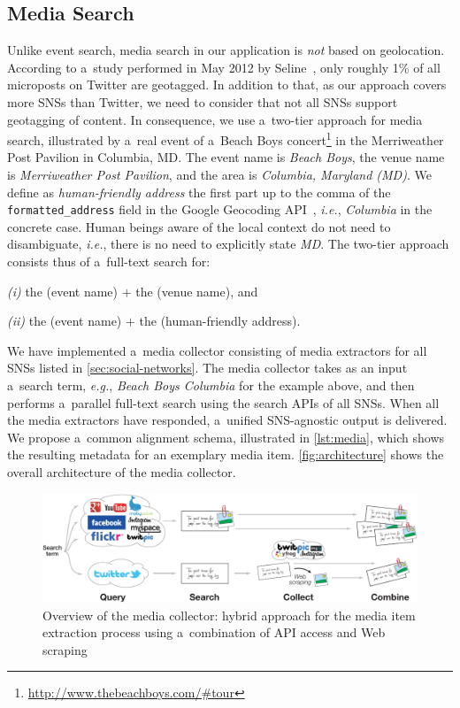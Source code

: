 \documentclass{acm_proc_article-sp}
\let\oldemph\emph
\renewcommand{\emph}[1]{\oldemph{\fontsize{9}{9}\selectfont #1}}
\begin{document}
\subsection{Media Search}
Unlike event search, media search in our application is \emph{not} based on geolocation.
According to a~study performed in May 2012 by Seline~\cite{Quora2012},
only roughly 1\% of all microposts on Twitter are geotagged.
In addition to that, as our approach covers more SNSs than Twitter,
we need to consider that not all SNSs support geotagging of content.
In consequence, we use a~two-tier approach for media search,
illustrated by a~real event of a~Beach Boys
concert\footnote{\url{http://www.thebeachboys.com/#tour}}
in the Merriweather Post Pavilion in Columbia, MD.
The event name is \emph{Beach Boys},
the venue name is \emph{Merriweather Post Pavilion},
and the area is \emph{Columbia, Maryland (MD)}.
We define as \emph{human-friendly address}
the first part up to the comma of the \texttt{formatted\_address} field
in the Google Geocoding API~\cite{Geocoding2012},
\emph{i.e.}, \emph{Columbia} in the concrete case.
Human beings aware of the local context do not need to disambiguate, \emph{i.e.},
there is no need to explicitly state \emph{MD}.
The two-tier approach consists thus of a~full-text search for:

\emph{(i)} the (event name) $+$ the (venue name), and

\emph{(ii)} the (event name) $+$ the (human-friendly address).

We have implemented a~media collector consisting of media extractors for all SNSs
listed in \autoref{sec:social-networks}.
The media collector takes as an input a~search term, \emph{e.g.},
\emph{Beach Boys Columbia} for the example above,
and then performs a~parallel full-text search using the search APIs of all SNSs.
When all the media extractors have responded, a~unified SNS-agnostic output is delivered.
We propose a~common alignment schema, illustrated in
\autoref{lst:media}, which shows the resulting metadata for an exemplary media item.
\autoref{fig:architecture} shows the overall architecture of the media collector.

\begin{figure}[bth!]
\centering
\includegraphics[width=0.8\linewidth]{./architecture.pdf}
\caption{Overview of the media collector: hybrid approach for the media item extraction process using a~combination of API access and Web scraping}
\label{fig:architecture}
\end{figure}
\end{document}
